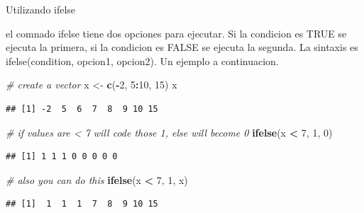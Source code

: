\documentclass[ignorenonframetext,]{beamer}
\newenvironment{Shaded}{\begin{snugshade}}{\end{snugshade}}
\newcommand{\KeywordTok}[1]{\textcolor[rgb]{0.13,0.29,0.53}{\textbf{#1}}}
\newcommand{\DecValTok}[1]{\textcolor[rgb]{0.00,0.00,0.81}{#1}}
\newcommand{\StringTok}[1]{\textcolor[rgb]{0.31,0.60,0.02}{#1}}
\newcommand{\CommentTok}[1]{\textcolor[rgb]{0.56,0.35,0.01}{\textit{#1}}}
\newcommand{\OperatorTok}[1]{\textcolor[rgb]{0.81,0.36,0.00}{\textbf{#1}}}
\newcommand{\NormalTok}[1]{#1}
\begin{document}
\begin{frame}[fragile]{Utilizando ifelse}

el comnado ifelse tiene dos opciones para ejecutar. Si la condicion es
TRUE se ejecuta la primera, si la condicion es FALSE se ejecuta la
segunda. La sintaxis es ifelse(condition, opcion1, opcion2). Un ejemplo
a continuacion.

\begin{Shaded}
\begin{Highlighting}[]
\CommentTok{# create a vector}
\NormalTok{x <-}\StringTok{ }\KeywordTok{c}\NormalTok{(}\OperatorTok{-}\DecValTok{2}\NormalTok{, }\DecValTok{5}\OperatorTok{:}\DecValTok{10}\NormalTok{, }\DecValTok{15}\NormalTok{)}
\NormalTok{x}
\end{Highlighting}
\end{Shaded}

\begin{verbatim}
## [1] -2  5  6  7  8  9 10 15
\end{verbatim}

\begin{Shaded}
\begin{Highlighting}[]
\CommentTok{# if values are < 7 will code those 1, else will become 0}
\KeywordTok{ifelse}\NormalTok{(x }\OperatorTok{<}\StringTok{ }\DecValTok{7}\NormalTok{, }\DecValTok{1}\NormalTok{, }\DecValTok{0}\NormalTok{)}
\end{Highlighting}
\end{Shaded}

\begin{verbatim}
## [1] 1 1 1 0 0 0 0 0
\end{verbatim}

\begin{Shaded}
\begin{Highlighting}[]
\CommentTok{# also you can do this}
\KeywordTok{ifelse}\NormalTok{(x }\OperatorTok{<}\StringTok{ }\DecValTok{7}\NormalTok{, }\DecValTok{1}\NormalTok{, x)}
\end{Highlighting}
\end{Shaded}

\begin{verbatim}
## [1]  1  1  1  7  8  9 10 15
\end{verbatim}

\end{frame}
\end{document}
